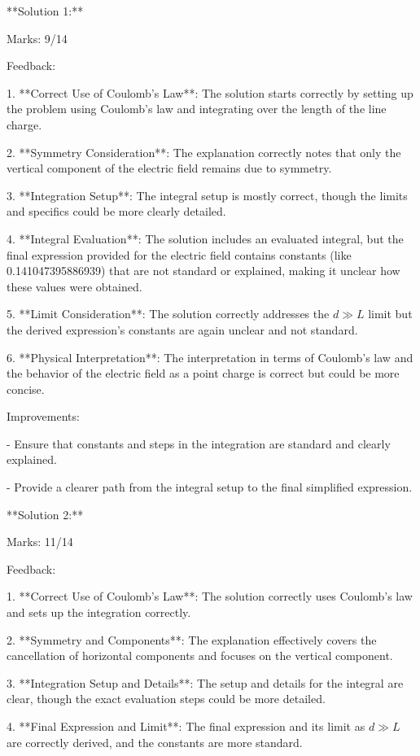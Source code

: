 \documentclass[a4paper,11pt]{article}
\begin{document}
**Solution 1:**

Marks: 9/14

Feedback:

1. **Correct Use of Coulomb's Law**: The solution starts correctly by setting up the problem using Coulomb's law and integrating over the length of the line charge. 

2. **Symmetry Consideration**: The explanation correctly notes that only the vertical component of the electric field remains due to symmetry.

3. **Integration Setup**: The integral setup is mostly correct, though the limits and specifics could be more clearly detailed.

4. **Integral Evaluation**: The solution includes an evaluated integral, but the final expression provided for the electric field contains constants (like 0.141047395886939) that are not standard or explained, making it unclear how these values were obtained.

5. **Limit Consideration**: The solution correctly addresses the \( d \gg L \) limit but the derived expression's constants are again unclear and not standard.

6. **Physical Interpretation**: The interpretation in terms of Coulomb's law and the behavior of the electric field as a point charge is correct but could be more concise.

Improvements:

- Ensure that constants and steps in the integration are standard and clearly explained.

- Provide a clearer path from the integral setup to the final simplified expression.

**Solution 2:**

Marks: 11/14

Feedback:

1. **Correct Use of Coulomb's Law**: The solution correctly uses Coulomb's law and sets up the integration correctly.

2. **Symmetry and Components**: The explanation effectively covers the cancellation of horizontal components and focuses on the vertical component.

3. **Integration Setup and Details**: The setup and details for the integral are clear, though the exact evaluation steps could be more detailed.

4. **Final Expression and Limit**: The final expression and its limit as \( d \gg L \) are correctly derived, and the constants are more standard.
\end{document}

